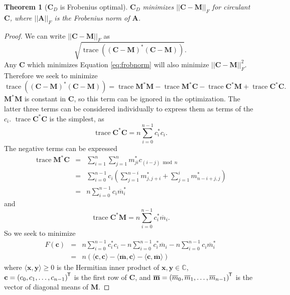 \documentclass[letterpaper,12pt,oneside,final]{article}
\newtheorem{theorem}{Theorem}
\newcommand{\ve}[1]{\mathbf{#1}}           %
\newcommand{\m}[1]{\mathbf{#1}}               %
\newcommand{\tr}[1]{{#1}^{\mkern-1.5mu\mathsf{T}}}              %
\newcommand{\conj}[1]{{#1}^{\ast}}
\newcommand{\norm}[1]{||{#1}||}              %
\newcommand{\frob}[1]{\norm{#1}_F}
\newcommand*{\trace}{\operatorname{trace}}
\newcommand{\widebar}[1]{\overline{#1}}
\newcommand{\field}[1]{\mathbb{#1}}
\newcommand{\Complex}{\field{C}}
\begin{document}
\begin{theorem}[$\m{C}_D$ is Frobenius optimal] \label{thm:optimal}
$\m{C}_D$ minimizes $\frob{\m{C} - \m{M}}$ for circulant $\m{C}$, where $\frob{\m{A}}$ is the Frobenius norm of $\m{A}$.
\end{theorem}
\begin{proof}
  We can write $\frob{\m{C} - \m{M}}$ as
  \begin{equation} \label{eq:frobnorm}
    \sqrt{\trace \left ( \conj{(\m{C} - \m{M})}(\m{C} - \m{M}) \right )}.
  \end{equation}
  Any $\m{C}$ which minimizes Equation \ref{eq:frobnorm} will also minimize $\frob{\m{C} - \m{M}}^2$. Therefore we seek to minimize
  \begin{equation} \label{eq:ToBeOptimized}
    \trace \left ( \conj{(\m{C} - \m{M})}(\m{C} - \m{M}) \right ) = \trace \conj{\m{M}} \m{M} - \trace \conj{\m{M}} \m{C} - \trace \conj{\m{C}} \m{M} + \trace \conj{\m{C}} \m{C}.
  \end{equation}
  $\conj{\m{M}} \m{M}$ is constant in $\m{C}$, so this term can be ignored in the optimization. The latter three terms can be considered individually to express them as terms of the $c_i$. $\trace \conj{\m{C}} \m{C}$ is the simplest, as
  \begin{equation} \label{eq:csquared}
    \trace \conj{\m{C}} \m{C} = n \sum_{i = 0}^{n-1} \conj{c}_i c_i.
  \end{equation}
  The negative terms can be expressed
  \begin{eqnarray} 
    \trace \conj{\m{M}} \m{C} & = & \sum_{i = 1}^n \sum_{j = 1}^n \conj{m}_{ji} c_{(i-j) \bmod n} \nonumber \\
    & = & \sum_{i = 0}^{n-1} c_i \left ( \sum_{j = 1}^{n - i} \conj{m}_{j,j+i} + \sum_{j = 1}^i \conj{m}_{n - i + j,j} \right ) \nonumber \\
    & = & n \sum_{i = 0}^{n-1} c_i \conj{ \widebar{m} }_i \label{eq:conjMC}
  \end{eqnarray}
  and
  \begin{equation} \label{eq:conjCM}
    \trace \conj{\m{C}} \m{M} = n \sum_{i = 0}^{n-1} \conj{c}_i \widebar{m}_i.
  \end{equation}
  So we seek to minimize
  \begin{eqnarray}
    F(\ve{c}) & = & n \sum_{i = 0}^{n-1} \conj{c}_i c_i - n \sum_{i = 0}^{n-1} \conj{c}_i \widebar{m}_i - n \sum_{i = 0}^{n-1} c_i \conj{ \widebar{m} }_i \nonumber \\
     & = & n \left ( \langle \ve{c}, \ve{c} \rangle - \langle \widebar{\ve{m}}, \ve{c} \rangle - \langle \ve{c}, \widebar{\ve{m}} \rangle \right ) \label{eq:innerproducts}
  \end{eqnarray}
  where $\langle \ve{x}, \ve{y} \rangle \geq 0$ is the Hermitian inner product of $\ve{x}, \ve{y} \in \Complex$, $\ve{c} = \tr{(c_0, c_1, \dots, c_{n-1})}$ is the first row of $\m{C}$, and $\widebar{\ve{m}} = \tr{(\widebar{m}_0, \widebar{m}_1, \dots, \widebar{m}_{n-1} )}$ is the vector of diagonal means of $\m{M}$.


\end{proof}
\end{document}
